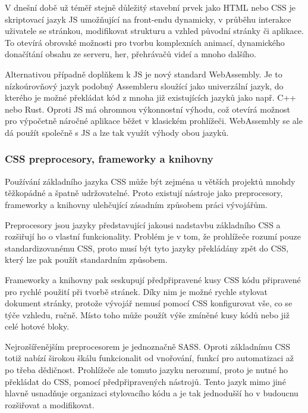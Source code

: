 \begin{itemize}
\begin{itemize}
		V dnešní době už téměř stejně důležitý stavební prvek jako \Ac{HTML} nebo \Ac{CSS} je skriptovací jazyk \ac{JS}
		umožňující na front-endu dynamicky, v průběhu interakce uživatele se stránkou, modifikovat strukturu a vzhled
		původní stránky či aplikace.
		To otevírá obrovské možnosti pro tvorbu komplexních animací, dynamického donačítání obsahu ze serveru, her, přehrávačů
		videí a mnoho dalšího. \cite{what_is_javascript}

		Alternativou případně doplňkem k \ac{JS} je nový standard WebAssembly.
		Je to nízkoúrovňový jazyk podobný Assembleru sloužící jako univerzální jazyk, do kterého je možné překládat
		kód z mnoha již existujících jazyků jako např. C++ nebo Rust.
		Oproti \ac{JS} má ohromnou výkonnostní výhodu, což otevírá možnost pro výpočetně náročné aplikace běžet
		v klasickém prohlížeči.
		WebAssembly se ale dá použít společně s \ac{JS} a lze tak využít výhody obou jazyků. \cite{webassembly}

		\subsubsection{CSS preprocesory, frameworky a knihovny}

		Používání základního jazyka \Ac{CSS} může být zejména u větších projektů mnohdy těžkopádné a špatně udržovatelné.
		Proto existují nástroje jako preprocesory, frameworky a knihovny ulehčující zásadním způsobem práci vývojářům.

		Preprocesory jsou jazyky představující jakousi nadstavbu základního \Ac{CSS} a rozšiřují ho o vlastní
		funkcionality.
		Problém je v tom, že prohlížeče rozumí pouze standardizovanému \Ac{CSS}, proto musí být tyto jazyky překládány
		zpět do \Ac{CSS}, který lze pak použít standardním způsobem.

		Frameworky a knihovny pak seskupují předpřipravené kusy \Ac{CSS} kódu připravené pro rychlé použití při tvorbě stránek.
		Díky nim je možné rychle stylovat dokument stránky, protože vývojář nemusí pomocí \Ac{CSS} konfigurovat vše, co se
		týče vzhledu, ručně.
		Místo toho může použít výše zmíněné kusy kódů nebo již celé hotové bloky.

		Nejrozšířenějším preprocesorem je jednoznačně \Ac{SASS}.
		Oproti základnímu \Ac{CSS} totiž nabízí širokou škálu funkcionalit od vnořování, funkcí pro automatizaci až po třeba
		dědičnost.
		Prohlížeče ale tomuto jazyku nerozumí, proto je nutné ho překládat do \Ac{CSS}, pomocí předpřipravených nástrojů.
		Tento jazyk mimo jiné hlavně usnadňuje organizaci stylovacího kódu a je tak jednodušší ho v budoucnu rozšiřovat a
		modifikovat. \cite{learn_sass}


\end{itemize}
\end{itemize}
